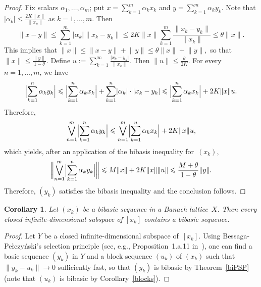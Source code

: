 \documentclass[12pt]{amsart}
\theoremstyle{plain}
\newtheorem{corollary}[theorem]{Corollary}
\theoremstyle{definition}
\newcommand{\abs}[1]{\lvert#1\rvert}
\newcommand{\norm}[1]{\lVert#1\rVert}
\newcommand{\Bigabs}[1]{\Bigl\lvert#1\Bigr\rvert}
\newcommand{\biggnorm}[1]{\biggl\lVert#1\biggr\rVert}
\renewcommand{\le}{\leqslant}
\begin{document}
\begin{proof}
  Fix scalars $\alpha_1,\dots,\alpha_m$; put
  $x=\sum_{k=1}^m\alpha_kx_k$ and $y=\sum_{k=1}^m\alpha_ky_k$. Note
  that $\abs{\alpha_k}\le\frac{2K\norm{x}}{\norm{x_k}}$ as
  $k=1,\dots,m$. Then
  \begin{displaymath}
    \norm{x-y}\le\sum_{k=1}^m\abs{\alpha_k}\norm{x_k-y_k}
    \le 2K\norm{x}\sum_{k=1}^m\frac{\norm{x_k-y_k}}{\norm{x_k}}
    \le\theta\norm{x}.
  \end{displaymath}
  This implies that
  \begin{math}
    \norm{x}\le\norm{x-y}+\norm{y}
    \le\theta\norm{x}+\norm{y},
  \end{math}
  so that $\norm{x}\le\frac{\norm{y}}{1-\theta}$.
  Define $u:=\sum_{k=1}^\infty \frac{\abs{x_k-y_k}}{\norm{x_k}}$.
  Then $\norm{u}\le\frac{\theta}{2K}$. For every $n=1,\dots,m$, we
  have
  \begin{displaymath}
    \Bigabs{\sum_{k=1}^n\alpha_ky_k}
    \le\Bigabs{\sum_{k=1}^n\alpha_kx_k}
    +\sum_{k=1}^n\abs{\alpha_k}\cdot\abs{x_k-y_k}
    \le\Bigabs{\sum_{k=1}^n\alpha_kx_k}+2K\norm{x}u.
  \end{displaymath}
  Therefore,
  \begin{displaymath}
    \bigvee_{n=1}^m\Bigabs{\sum_{k=1}^n\alpha_ky_k}
    \le\bigvee_{n=1}^m\Bigabs{\sum_{k=1}^n\alpha_kx_k}
    +2K\norm{x}u,
  \end{displaymath}
  which yields, after an application of the bibasis inequality
  for~$(x_k)$,
  \begin{displaymath}
    \biggnorm{\bigvee_{n=1}^m\Bigabs{\sum_{k=1}^n\alpha_ky_k}}
    \le M\norm{x}+2K\norm{x}\norm{u}
    \le\frac{M+\theta}{1-\theta}\norm{y}.
  \end{displaymath}
  Therefore, $(y_k)$ satisfies the bibasis inequality and the
  conclusion follows.
\end{proof}

\begin{corollary}\label{subspace}
  Let $(x_k)$ be a bibasic sequence in a Banach lattice~$X$. Then
  every closed infinite-dimensional subspace of $[x_k]$ contains a
  bibasic sequence.
\end{corollary}

\begin{proof}
  Let $Y$ be a closed infinite-dimensional subspace of~$[x_k]$. Using
  Bessaga-Pe{\l}\-czy{\'n}\-ski's selection principle (see, e.g.,
  Proposition~1.a.11 in~\cite{Lindenstrauss:77}), one can find a basic
  sequence $(y_k)$ in $Y$ and a block sequence $(u_k)$ of $(x_k)$ such
  that $\norm{y_k-u_k}\to 0$ sufficiently fast, so that $(y_k)$ is bibasic by
  Theorem~\ref{biPSP} (note that $(u_k)$ is bibasic by
  Corollary~\ref{blocks}).
\end{proof}
\end{document}
